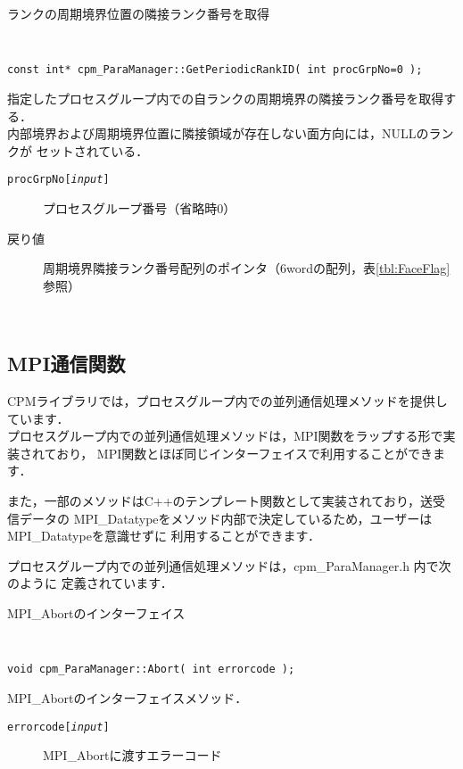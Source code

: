 \begin{spacing}{0.8}
\begin{itembox}[l]{ランクの周期境界位置の隣接ランク番号を取得}
{\tt
\begin{verbatim}
const int* cpm_ParaManager::GetPeriodicRankID( int procGrpNo=0 );
\end{verbatim}
}
指定したプロセスグループ内での自ランクの周期境界の隣接ランク番号を取得する．\\
内部境界および周期境界位置に隣接領域が存在しない面方向には，NULLのランクが
セットされている．
\begin{description}
\item[{\tt procGrpNo[{\it input}]}] プロセスグループ番号（省略時0）
\\
\item[戻り値]周期境界隣接ランク番号配列のポインタ（6wordの配列，表\ref{tbl:FaceFlag}参照）
\end{description}
\end{itembox}\\
\end{spacing}


\clearpage


\subsection{MPI通信関数}
\label{mpifunc}
CPMライブラリでは，プロセスグループ内での並列通信処理メソッドを提供しています．\\
プロセスグループ内での並列通信処理メソッドは，MPI関数をラップする形で実装されており，
MPI関数とほぼ同じインターフェイスで利用することができます．

また，一部のメソッドはC++のテンプレート関数として実装されており，送受信データの
MPI\_Datatypeをメソッド内部で決定しているため，ユーザーはMPI\_Datatypeを意識せずに
利用することができます．

プロセスグループ内での並列通信処理メソッドは，cpm\_ParaManager.h 内で次のように
定義されています．\\

\begin{spacing}{0.8}
\begin{itembox}[l]{MPI\_Abortのインターフェイス}
{\tt
\begin{verbatim}
void cpm_ParaManager::Abort( int errorcode );
\end{verbatim}
}
MPI\_Abortのインターフェイスメソッド．
\begin{description}
\item[{\tt errorcode[{\it input}]}] MPI\_Abortに渡すエラーコード
\end{description}
\end{itembox}\\
\end{spacing}

